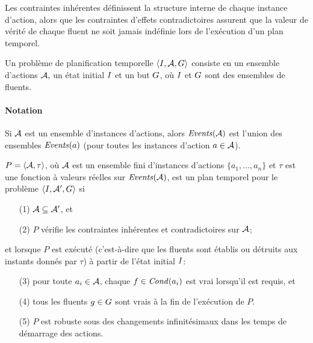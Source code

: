 Les contraintes inhérentes définissent la structure interne de chaque instance d'action, alors que les contraintes d'effets contradictoires assurent que la valeur de vérité de chaque fluent ne soit jamais indéfinie lors de l'exécution d'un plan temporel. %

\begin{definition}
Un problème de planification temporelle $\langle I, \mathcal{A}, G \rangle$ consiste en un ensemble d'actions $\mathcal{A},$ un état initial $I$ et un but $G$, où $I$ et $G$ sont des ensembles de fluents.
\end{definition}
\paragraph*{Notation} Si $\mathcal{A}$ est un ensemble d'instances d'actions, alors $\mathit{Events}(\mathcal{A})$ est l'union des ensembles $\mathit{Events}(a)$ (pour toutes les instances d'action $a\in \mathcal{A}$).

\begin{definition}\label{def:plan-temporel}
$P = \langle \mathcal{A}, \tau \rangle$, où $\mathcal{A}$ est un ensemble fini d'instances d'actions $\{a_1,\ldots, a_n\}$ et $\tau$ est une fonction à valeurs réelles sur $\mathit{Events}(\mathcal{A})$, est un plan temporel pour le problème $\langle I , \mathcal{A}^{\prime}, G \rangle$ si
\begin{enumerate}
\item[(1)] $\mathcal{A} \subseteq \mathcal{A}^{\prime}$, et
\item[(2)] $P$ vérifie les contraintes inhérentes et contradictoires sur $\mathcal{A}$;
\end{enumerate}
et lorsque $P$ est exécuté (c'est-à-dire que les fluents sont établis ou détruits aux instants donnés par $\tau$) à partir de l'état initial $I$:
\begin{enumerate}
\item[(3)] pour toute $a_i \in \mathcal{A}$, chaque $f \in \mathit{Cond}(a_i)$ est vrai lorsqu'il est requis, et
\item[(4)] tous les fluents $g \in G$ sont vrais à la fin de l'exécution de $P$.
\item[(5)] $P$ est robuste sous des changements infinitésimaux dans les temps de démarrage des actions.
\end{enumerate}
\end{definition}

